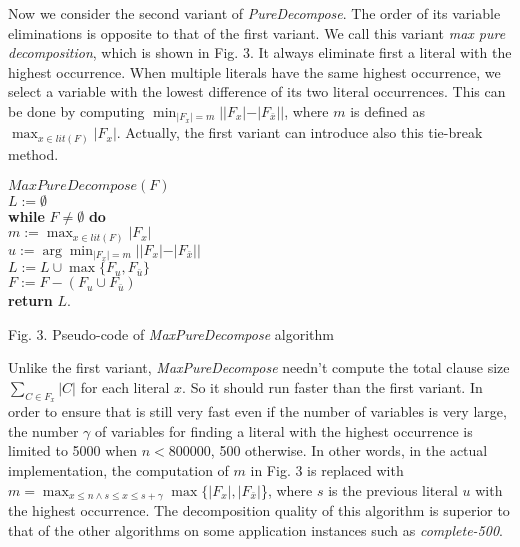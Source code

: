 \documentclass{llncs}
\begin{document}
Now we consider the second variant of \emph{PureDecompose}. The
order of its variable eliminations is opposite to that of the first
variant. We call this variant \emph{max pure decomposition}, which
is shown in Fig. 3.  It always eliminate first a literal with the
highest occurrence. When multiple literals  have the same highest
occurrence, we select a variable with the lowest difference of its
two literal occurrences. This can be done by computing
$\min_{|F_x|=m} ||F_x| - |F_{\bar x}|| $, where $m$ is defined as
$\max_{x \in lit(F)} |F_x|$. Actually, the first variant can
introduce also this tie-break method.

\begin{flushleft}
\begin{sf}
\begin{footnotesize}
\hskip 12mm $MaxPureDecompose (F)$\\
\hskip 16mm $ L := \emptyset $\\
\hskip 16mm {\bf while } $ F \neq \emptyset $ {\bf do}\\
\hskip 20mm    $ m := \max_{x \in lit(F)} |F_x|$\\
\hskip 20mm    $ u :=\arg \min_{|F_x|=m} ||F_x| - |F_{\bar x}|| $\\
\hskip 20mm    $L := L \cup \max\{ F_u, F_{\bar u} \}$\\
\hskip 20mm    $F := F - (F_u \cup F_{\bar u})$\\
\hskip 16mm  {\bf return} $L$.

\vspace{1em}
\hskip 8mm \textrm{Fig. 3. Pseudo-code of
\emph{MaxPureDecompose} algorithm}
\end{footnotesize}
\end{sf}
\end{flushleft}

   Unlike the first variant, \emph{MaxPureDecompose} needn't compute
the total clause size $\sum_{C \in F_x} |C|$ for each literal $x$.
So it should run faster than the first variant.
   In order to ensure that is still very fast even if the number of variables is very large,
the number $\gamma$ of variables for finding a literal with the
highest occurrence is limited to 5000 when $n < 800000$, 500
otherwise. In other words, in the actual implementation, the
computation of $m$ in Fig. 3 is replaced with $ m = \max_{x \leq n
\wedge s \leq x \leq s+ \gamma} \max \{|F_x|,|F_{\bar x}|$\}, where
$s$ is the previous literal $u$ with the highest occurrence. The
decomposition quality of this algorithm is superior to that of the
other algorithms on some
   application instances such as \emph{complete-500}.
\end{document}
